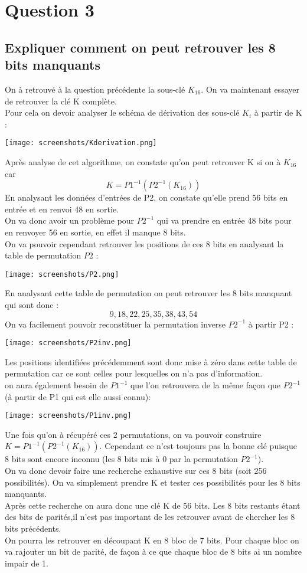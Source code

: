\documentclass[a4paper,11pt]{article}
\begin{document}
	\section{Question 3}
	\subsection{Expliquer comment on peut retrouver les 8 bits manquants}
	On à retrouvé à la question précédente la sous-clé $K_{16}$. On va maintenant essayer de retrouver la clé K complète.\\
	Pour cela on devoir analyser le schéma de dérivation des sous-clé $K_{i}$ à partir de K :
	\begin{center}\texttt{[image: screenshots/Kderivation.png]}\end{center}
	Après analyse de cet algorithme, on constate qu'on peut retrouver K si on à $K_{16}$ car 
	$$K =  P1^{-1}(P2^{-1}(K_{16}))$$
	En analysant les données d'entrées de P2, on constate qu'elle prend 56 bits en entrée et en renvoi 48 en sortie.\\
	On va donc avoir un problème pour $P2^{-1}$ qui va prendre en entrée 48 bits pour en renvoyer 56 en sortie, en effet il manque 8 bits.\\
	On va pouvoir cependant retrouver les positions de ces 8 bits en analysant la table de permutation $P2$ : 
	\begin{center}\texttt{[image: screenshots/P2.png]}\end{center}
	En analysant cette table de permutation on peut retrouver les 8 bits manquant qui sont donc : 
	$$ 9, 18, 22, 25, 35, 38, 43, 54$$
	On va facilement pouvoir reconstituer la permutation inverse $P2^{-1}$ à partir P2 :
	\begin{center}\texttt{[image: screenshots/P2inv.png]}\end{center}
	Les positions identifiées précédemment sont donc mise à zéro dans cette table de permutation car ce sont celles pour lesquelles on n'a pas d'information.\\ 
	on aura également besoin de $P1^{-1}$ que l'on retrouvera de la même façon que $P2^{-1}$ (à partir de P1 qui est elle aussi connu): 
	\begin{center}\texttt{[image: screenshots/P1inv.png]}\end{center}
	Une fois qu'on à récupéré ces 2 permutations, on va pouvoir construire $K = P1^{-1}(P2^{-1}(K_{16}))$. Cependant ce n'est toujours pas la bonne clé puisque 8 bits sont encore inconnu (les 8 bits mis à 0 par la permutation  $P2^{-1}$). \\
	On va donc devoir faire une recherche exhaustive sur ces 8 bits (soit 256 possibilités). On va simplement prendre K et tester ces possibilités pour les 8 bits manquants.\\
	Après cette recherche on aura donc une clé K de 56 bits. Les 8 bits restants étant des bits de parités,il n'est pas important de les retrouver avant de chercher les 8 bits précédents.\\
	On pourra les retrouver en découpant K en 8 bloc de 7 bits. Pour chaque bloc on va rajouter un bit de parité, de façon à ce que chaque bloc de 8 bits ai un nombre impair de 1.
	
\end{document}
